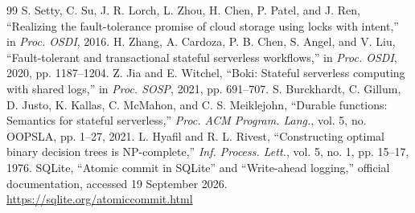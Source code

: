 \documentclass[conference,10pt]{IEEEtran}
\begin{document}
\begin{thebibliography}{99}
 S. Setty, C. Su, J. R. Lorch, L. Zhou, H. Chen, P. Patel, and J. Ren, ``Realizing the fault-tolerance promise of cloud storage using locks with intent,'' in \emph{Proc. OSDI}, 2016.
 H. Zhang, A. Cardoza, P. B. Chen, S. Angel, and V. Liu, ``Fault-tolerant and transactional stateful serverless workflows,'' in \emph{Proc. OSDI}, 2020, pp. 1187--1204.
 Z. Jia and E. Witchel, ``Boki: Stateful serverless computing with shared logs,'' in \emph{Proc. SOSP}, 2021, pp. 691--707.
 S. Burckhardt, C. Gillum, D. Justo, K. Kallas, C. McMahon, and C. S. Meiklejohn, ``Durable functions: Semantics for stateful serverless,'' \emph{Proc. ACM Program. Lang.}, vol. 5, no. OOPSLA, pp. 1--27, 2021.
 L. Hyafil and R. L. Rivest, ``Constructing optimal binary decision trees is NP-complete,'' \emph{Inf. Process. Lett.}, vol. 5, no. 1, pp. 15--17, 1976.
 SQLite, ``Atomic commit in SQLite'' and ``Write-ahead logging,'' official documentation, accessed 19 September 2026. \url{https://sqlite.org/atomiccommit.html}
\end{thebibliography}
\end{document}
